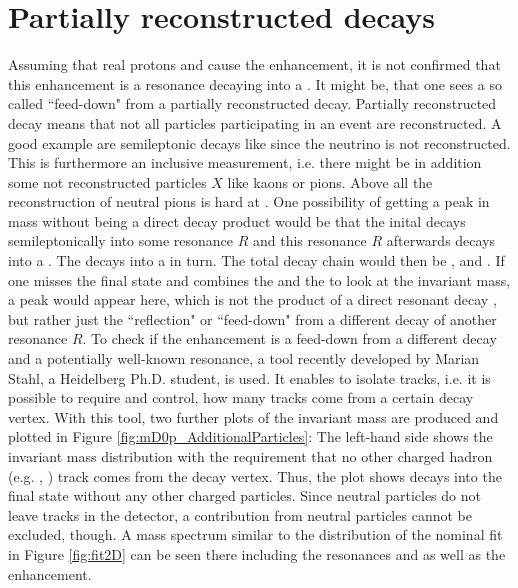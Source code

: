 \section{Partially reconstructed decays}
Assuming that real protons and \Dz cause the enhancement, it is not confirmed that this enhancement is a resonance decaying into a \Dz\proton.
It might be, that one sees a so called ``feed-down" from a partially reconstructed decay.
Partially reconstructed decay means that not all particles participating in an event are reconstructed.
A good example are semileptonic decays like \LbToDpmunuX since the neutrino is not reconstructed.
This is furthermore an inclusive measurement, i.e. there might be in addition some not reconstructed particles $X$ like kaons or pions.
Above all the reconstruction of neutral pions is hard at \lhcb.
One possibility of getting a peak in \Dz\proton mass without being a direct decay product would be that the inital \Lb decays semileptonically into some resonance $R$ and this resonance $R$ afterwards decays into a \Dstar\proton.
The \Dstar decays into a \D\pion in turn.
The total decay chain would then be ,  and \decay{\Dstar}{\D\pion}.
If one misses the final state \pion and combines the \D and the \proton to look at the invariant \D\proton mass, a peak would appear here, which is not the product of a direct resonant decay , but rather just the ``reflection" or ``feed-down" from a different decay of another resonance $R$.
To check if the enhancement is a feed-down from a different decay and a potentially well-known resonance, a tool recently developed by Marian Stahl, a Heidelberg Ph.D. student, is used.
It enables to isolate tracks, i.e. it is possible to require and control, how many tracks come from a certain decay vertex.
With this tool, two further plots of the \Dz\proton invariant mass are produced and plotted in Figure \ref{fig:mD0p_AdditionalParticles}:
The left-hand side shows the invariant \Dz\proton mass distribution with the requirement that no other charged hadron (e.g. \pion, \kaon) track comes from the \Dz\proton\mun decay vertex.
Thus, the plot shows \Lb decays into the \Dz\proton\mun final state without any other charged particles.
Since neutral particles do not leave tracks in the detector, a contribution from neutral particles cannot be excluded, though.
A \Dz\proton mass spectrum similar to the distribution of the nominal fit in Figure \ref{fig:fit2D} can be seen there including the resonances \LcResI and \LcResII as well as the enhancement.

